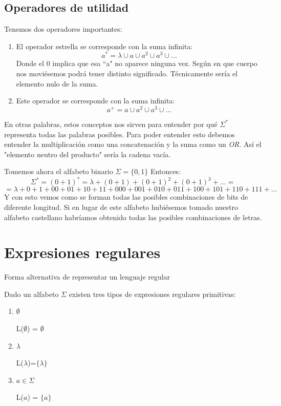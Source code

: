 \documentclass{apuntes}
\begin{document}
\subsection{Operadores de utilidad}
Tenemos dos operadores importantes:
\begin{enumerate}
\item \begin{defn}[Estrella]
El operador estrella se corresponde con la suma infinita:
\[a^* = \lambda \cup a \cup a^2 \cup a^3 \cup ...\]
Donde el 0 implica que esa ``a" no aparece ninguna vez. Según en que cuerpo nos moviésemos podrá tener distinto significado. Técnicamente sería el elemento nulo de la suma.
\end{defn}
\item \begin{defn}[Suma]
Este operador se corresponde con la suma infinita:
\[a^+ = a \cup a^2 \cup a^3 \cup ...\]
\end{defn}
\end{enumerate}
En otras palabras, estos conceptos nos sirven para entender por qué $\Sigma ^*$  representa todas las palabras posibles. Para poder entender esto debemos entender la multiplicación como una concatenación y la suma como un \textit{OR}. Así el "elemento neutro del producto" sería la cadena vacía.

Tomemos ahora el alfabeto binario $\Sigma = \lbrace 0, 1 \rbrace$
Entonces:
\[\Sigma ^* = (0+1)^* = \lambda + (0+1)+(0+1)^2+(0+1)^3+... = \]
\[= \lambda + 0 + 1 + 00 + 01 +10 +11 +000+001+010+011+100+101+110+111+...\]
Y con esto vemos como se forman todas las posibles combinaciones de bits de diferente longitud. Si en lugar de este alfabeto hubiésemos tomado nuestro alfabeto castellano habríamos obtenido todas las posibles combinaciones de letras.

\section{Expresiones regulares}

\begin{defn}
Forma alternativa de representar un lenguaje regular
\end{defn}

Dado un alfabeto $\Sigma$ existen tres tipos de expresiones regulares primitivas:
\begin{enumerate}
\item $\emptyset$ 

L($\emptyset$) = $\emptyset$
\item $\lambda$

 L($\lambda$)=$\lbrace \lambda \rbrace$
\item $a\in \Sigma$ 

L($a$) = $\lbrace a \rbrace$
\end{enumerate}
\end{document}
